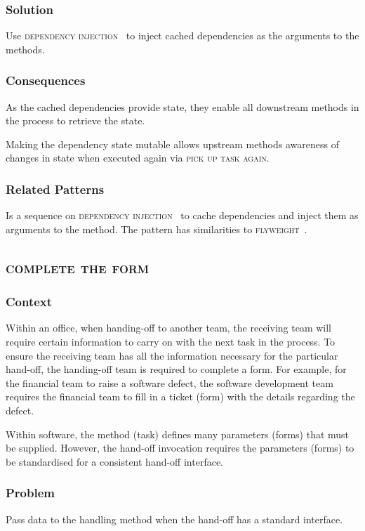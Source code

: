 \documentclass[prodmode]{style/acmlarge}
\begin{document}
\subsubsection*{\textbf{Solution}} Use \textsc{dependency injection}~\cite{ioc}
to inject cached dependencies as the arguments to the methods.

\subsubsection*{Consequences} As the cached dependencies provide state, they
enable all downstream methods in the process to retrieve the state.

Making the dependency state mutable allows upstream methods awareness of changes
in state when executed again via \textsc{pick up task again}.

\subsubsection*{Related Patterns} Is a sequence on \textsc{dependency
injection}~\cite{ioc} to cache dependencies and inject them as arguments to the
method.  The pattern has similarities to \textsc{flyweight}~\cite{gof}.



\subsection{\textsc{\textbf{complete the form}}}

\subsubsection*{Context} Within an office, when handing-off to another team, the
receiving team will require certain information to carry on with the next task
in the process.  To ensure the receiving team has all the information necessary
for the particular hand-off, the handing-off team is required to complete a
form.  For example, for the financial team to raise a software defect, the
software development team requires the financial team to fill in a ticket (form)
with the details regarding the defect.

Within software, the method (task) defines many parameters (forms) that must be
supplied.  However, the hand-off invocation requires the parameters (forms) to
be standardised for a consistent hand-off interface.

\subsubsection*{\textbf{Problem}} Pass data to the handling method when the hand-off has
a standard interface.
\end{document}
